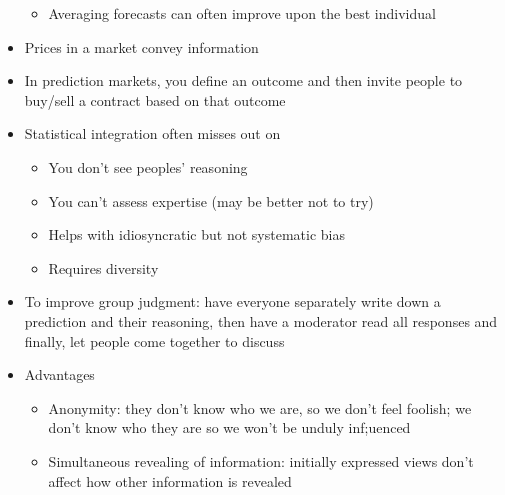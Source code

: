 \documentclass[12pt]{article}
\begin{document}
\begin{itemize}
\begin{itemize}
\item Averaging forecasts can often improve upon the best individual \end{itemize} 
\item Prices in a market convey information 
\item In prediction markets, you define an outcome and then invite people to buy/sell a contract based on that outcome 
\item Statistical integration often misses out on \begin{itemize} 
\item You don't see peoples' reasoning 
\item You can't assess expertise (may be better not to try) 
\item Helps with idiosyncratic but not systematic bias 
\item Requires diversity \end{itemize} 
\item To improve group judgment: have everyone separately write down a prediction and their reasoning, then have a moderator read all responses and finally, let people come together to discuss 
\item Advantages \begin{itemize} 
\item Anonymity: they don't know who we are, so we don't feel foolish; we don't know who they are so we won't be unduly inf;uenced
\item Simultaneous revealing of information: initially expressed views don't affect how other information is revealed \end{itemize} 
\end{itemize}
\newpage
\end{document}
